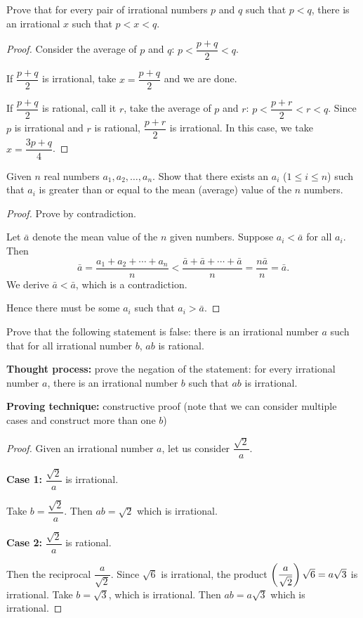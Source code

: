 \begin{prbm}
Prove that for every pair of irrational numbers $p$ and $q$ such that $p<q$, there is an irrational $x$ such that $p<x<q$.
\end{prbm}

\begin{proof}
Consider the average of $p$ and $q$: $p<\dfrac{p+q}{2}<q$.

If $\dfrac{p+q}{2}$ is irrational, take $x=\dfrac{p+q}{2}$ and we are done.

If $\dfrac{p+q}{2}$ is rational, call it $r$, take the average of $p$ and $r$: $p<\dfrac{p+r}{2}<r<q$. Since $p$ is irrational and $r$ is rational, $\dfrac{p+r}{2}$ is irrational. In this case, we take $x=\dfrac{3p+q}{4}$.
\end{proof}

\begin{prbm}
Given $n$ real numbers $a_1,a_2,\dots,a_n$. Show that there exists an $a_i$ ($1\le i\le n$) such that $a_i$ is greater than or equal to the mean (average) value of the $n$ numbers.
\end{prbm}

\begin{proof}
Prove by contradiction.

Let $\bar{a}$ denote the mean value of the $n$ given numbers. Suppose $a_i<\bar{a}$ for all $a_i$. Then
\[ \bar{a}=\frac{a_1+a_2+\cdots+a_n}{n}<\frac{\bar{a}+\bar{a}+\cdots+\bar{a}}{n}=\frac{n\bar{a}}{n}=\bar{a}. \]
We derive $\bar{a}<\bar{a}$, which is a contradiction.

Hence there must be some $a_i$ such that $a_i>\bar{a}$.
\end{proof}

\begin{prbm}
Prove that the following statement is false: there is an irrational number $a$ such that for all irrational number $b$, $ab$ is rational.
\end{prbm}

\textbf{Thought process:} prove the negation of the statement: for every irrational number $a$, there is an irrational number $b$ such that $ab$ is irrational.

\textbf{Proving technique:} constructive proof (note that we can consider multiple cases and construct more than one $b$)

\begin{proof}
Given an irrational number $a$, let us consider $\dfrac{\sqrt{2}}{a}$.

\textbf{Case 1:} $\dfrac{\sqrt{2}}{a}$ is irrational.

Take $b=\dfrac{\sqrt{2}}{a}$. Then $ab=\sqrt{2}$ which is irrational.

\textbf{Case 2:} $\dfrac{\sqrt{2}}{a}$ is rational.

Then the reciprocal $\dfrac{a}{\sqrt{2}}$. Since $\sqrt{6}$ is irrational, the product $\left(\dfrac{a}{\sqrt{2}}\right)\sqrt{6}=a\sqrt{3}$ is irrational. Take $b=\sqrt{3}$, which is irrational. Then $ab=a\sqrt{3}$ which is irrational.
\end{proof}

